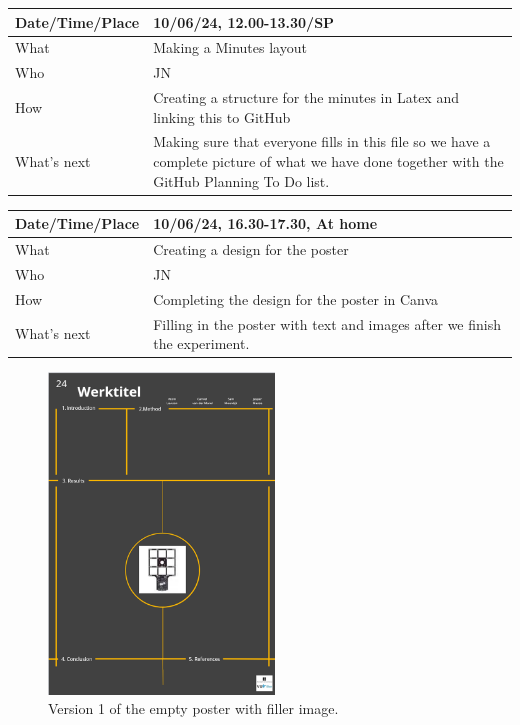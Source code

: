\documentclass{article}
\begin{document}

\begin{table}[H]
\begin{tabular}{|p{1.5in}|p{4in}|}
\hline
Date/Time/Place &  10/06/24, 12.00-13.30/SP\\ \hline
What            &  Making a Minutes layout\\ \hline
Who             &  JN\\ \hline
How             &  Creating a structure for the minutes in Latex and linking this to GitHub\\ \hline
What's next     &  Making sure that everyone fills in this file so we have a complete picture of what we have done together with the GitHub Planning To Do list.\\ \hline
\end{tabular}
\end{table}

\begin{table}[H]
\begin{tabular}{|p{1.5in}|p{4in}|}
\hline
Date/Time/Place & 10/06/24, 16.30-17.30, At home \\ \hline
What            &  Creating a design for the poster\\ \hline
Who             &  JN \\ \hline
How             &  Completing the design for the poster in Canva\\ \hline
What's next     &  Filling in the poster with text and images after we finish the experiment.\\ \hline
\end{tabular}
\end{table}

\begin{figure}[H]
    \centering
    \includegraphics[width=6cm]{PosterV1.png}
    \caption{Version 1 of the empty poster with filler image.}   
\end{figure}
\end{document}
